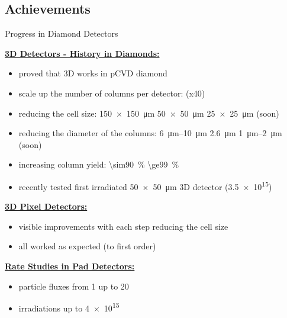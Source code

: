 \subsection{Achievements}
\begin{frame}{Progress in Diamond Detectors}

	\textbf{\underline{3D Detectors - History in Diamonds:}}\vspace*{5pt}
	\begin{itemize}\itemfill
		\item proved that 3D works in pCVD diamond
		\item scale up the number of columns per detector:  \ra {} (x40)
		\item reducing the cell size: \SI{150x150}{\micro\meter} \ra \SI{50x50}{\micro\meter} \ra \SI{25x25}{\micro\meter} (soon)
		\item reducing the diameter of the columns: \SIrange{6}{10}{\micro\meter} \ra \SI{2.6}{\micro\meter} \ra \SIrange{1}{2}{\micro\meter} (soon)
		\item \ra increasing column yield: \SI{\sim90}{\%} \ra \SI{\ge99}{\%}
		\item recently tested first irradiated \SI{50x50}{\micro\meter} 3D detector (\SI{3.5e15}{\ncm})
	\end{itemize}
	
	\vspace*{5pt}\textbf{\underline{3D Pixel Detectors:}}\vspace*{5pt}
	\begin{itemize}\itemfill
		\item visible improvements with each step reducing the cell size
		\item all worked as expected (to first order)
	\end{itemize}
	
	\vspace*{5pt}\textbf{\underline{Rate Studies in Pad Detectors:}}\vspace*{5pt}
	\begin{itemize}\itemfill
		\item particle fluxes from \SI{1}{\khzcm} up to \SI{20}{\mhzcm}
		\item irradiations up to \SI{4e15}{\ncm}
	\end{itemize}


\end{frame}

